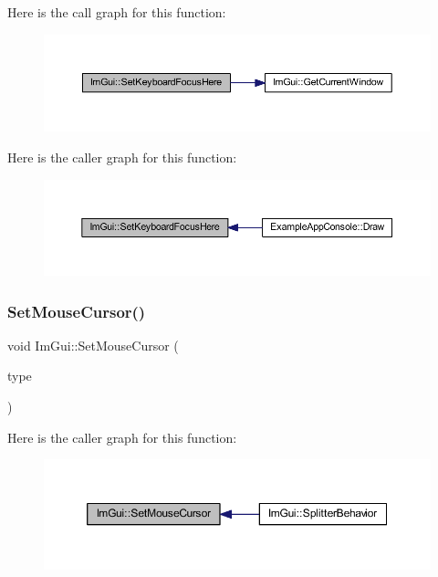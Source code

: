 Here is the call graph for this function\+:
\nopagebreak
\begin{figure}[H]
\begin{center}
\leavevmode
\includegraphics[width=350pt]{namespace_im_gui_ae85e5fba7e88cea8bd3ba5b687c979f2_cgraph}
\end{center}
\end{figure}
Here is the caller graph for this function\+:
\nopagebreak
\begin{figure}[H]
\begin{center}
\leavevmode
\includegraphics[width=350pt]{namespace_im_gui_ae85e5fba7e88cea8bd3ba5b687c979f2_icgraph}
\end{center}
\end{figure}
\mbox{\label{namespace_im_gui_ae212a3516efcba50a684df202c8e63ad}} 
\subsubsection{\texorpdfstring{Set\+Mouse\+Cursor()}{SetMouseCursor()}}
{\footnotesize\ttfamily void Im\+Gui\+::\+Set\+Mouse\+Cursor (\begin{DoxyParamCaption}\item[{\mbox{\hyperlink{imgui_8h_a9223d6c82bb5d12c2eab5f829ca520ef}{Im\+Gui\+Mouse\+Cursor}}}]{type }\end{DoxyParamCaption})}

Here is the caller graph for this function\+:
\nopagebreak
\begin{figure}[H]
\begin{center}
\leavevmode
\includegraphics[width=350pt]{namespace_im_gui_ae212a3516efcba50a684df202c8e63ad_icgraph}
\end{center}
\end{figure}
\mbox{\label{namespace_im_gui_acb36abbe2ac25534eed9fc73f8c6adef}} 
